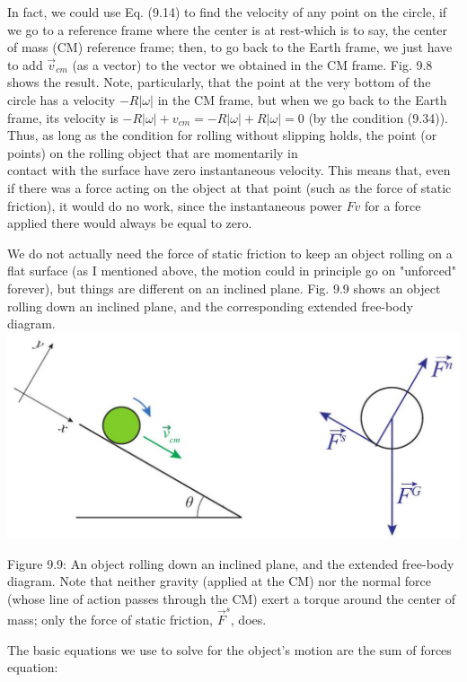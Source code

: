 \documentclass[10pt]{article}
\begin{document}
In fact, we could use Eq. (9.14) to find the velocity of any point on the circle, if we go to a reference frame where the center is at rest-which is to say, the center of mass (CM) reference frame; then, to go back to the Earth frame, we just have to add $\vec{v}_{c m}$ (as a vector) to the vector we obtained in the CM frame. Fig. 9.8 shows the result. Note, particularly, that the point at the very bottom of the circle has a velocity $-R|\omega|$ in the CM frame, but when we go back to the Earth frame, its velocity is $-R|\omega|+v_{c m}=-R|\omega|+R|\omega|=0$ (by the condition (9.34)). Thus, as long as the condition for rolling without slipping holds, the point (or points) on the rolling object that are momentarily in\\
contact with the surface have zero instantaneous velocity. This means that, even if there was a force acting on the object at that point (such as the force of static friction), it would do no work, since the instantaneous power $F v$ for a force applied there would always be equal to zero.

We do not actually need the force of static friction to keep an object rolling on a flat surface (as I mentioned above, the motion could in principle go on "unforced" forever), but things are different on an inclined plane. Fig. 9.9 shows an object rolling down an inclined plane, and the corresponding extended free-body diagram.\\
\includegraphics[max width=\textwidth, center]{2024_09_14_9969b06773f10b6936e8g-227}

Figure 9.9: An object rolling down an inclined plane, and the extended free-body diagram. Note that neither gravity (applied at the CM) nor the normal force (whose line of action passes through the CM) exert a torque around the center of mass; only the force of static friction, $\vec{F}^{s}$, does.

The basic equations we use to solve for the object's motion are the sum of forces equation:
\end{document}
